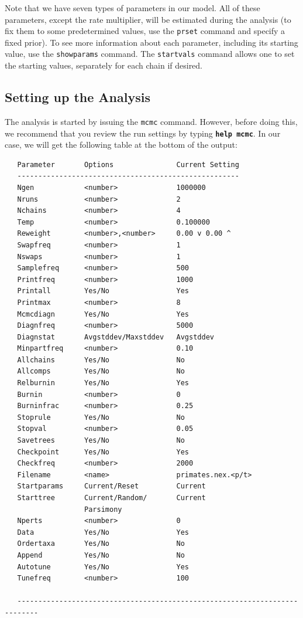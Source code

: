 \documentclass[12pt]{book}
\newcommand{\ttt}[1]{\texttt{#1}}
\newcommand{\tb}[1]{\ttt{\textbf{#1}}}
\begin{document}
Note that we have seven types of parameters in our model. All of these parameters, except the rate
multiplier, will be estimated during the analysis (to fix them to some predetermined values, use
the \ttt{prset} command and specify a fixed prior). To see more information about each parameter,
including its starting value, use the \ttt{showparams} command. The \ttt{startvals} command allows
one to set the starting values, separately for each chain if desired.

\subsection{Setting up the Analysis}

The analysis is started by issuing the \ttt{mcmc} command. However, before doing this, we recommend
that you review the run settings by typing \tb{help mcmc}. In our case, we will get the following
table at the bottom of the output:

\begin{singlespacing}
\footnotesize
\begin{verbatim}
   Parameter       Options               Current Setting
   -----------------------------------------------------
   Ngen            <number>              1000000
   Nruns           <number>              2
   Nchains         <number>              4
   Temp            <number>              0.100000
   Reweight        <number>,<number>     0.00 v 0.00 ^
   Swapfreq        <number>              1
   Nswaps          <number>              1
   Samplefreq      <number>              500
   Printfreq       <number>              1000
   Printall        Yes/No                Yes
   Printmax        <number>              8
   Mcmcdiagn       Yes/No                Yes
   Diagnfreq       <number>              5000
   Diagnstat       Avgstddev/Maxstddev   Avgstddev
   Minpartfreq     <number>              0.10
   Allchains       Yes/No                No
   Allcomps        Yes/No                No
   Relburnin       Yes/No                Yes
   Burnin          <number>              0
   Burninfrac      <number>              0.25
   Stoprule        Yes/No                No
   Stopval         <number>              0.05
   Savetrees       Yes/No                No
   Checkpoint      Yes/No                Yes
   Checkfreq       <number>              2000
   Filename        <name>                primates.nex.<p/t>
   Startparams     Current/Reset         Current
   Starttree       Current/Random/       Current
                   Parsimony
   Nperts          <number>              0
   Data            Yes/No                Yes
   Ordertaxa       Yes/No                No
   Append          Yes/No                No
   Autotune        Yes/No                Yes
   Tunefreq        <number>              100

   ---------------------------------------------------------------------------
\end{verbatim}
\normalsize
\end{singlespacing}
\end{document}

